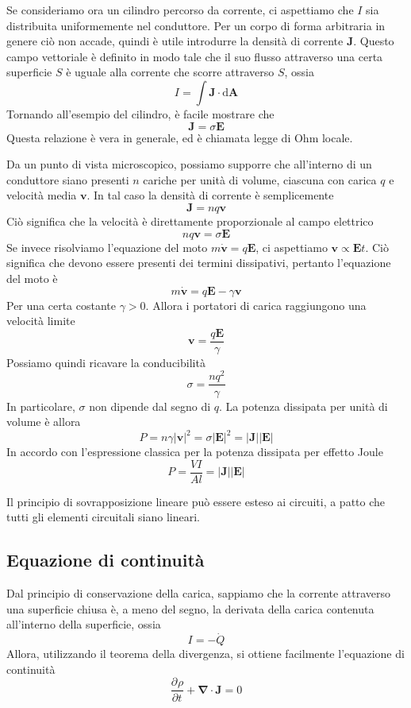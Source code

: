 \documentclass[a4paper,11pt]{book}
\newcommand{\dif}{\mathrm{d}}
\newcommand{\der}[3][]{\frac{\partial ^{#1}#2}{\partial {#3}^{#1}}}
\let\oldnabla\nabla
\renewcommand{\nabla}{\vec{\oldnabla}}
\renewcommand{\vec}[1]{\mathbf{#1}}
\theoremstyle{theorem}
\theoremstyle{definition}
\begin{document}
Se consideriamo ora un cilindro percorso da corrente, ci aspettiamo che $I$ sia distribuita uniformemente nel conduttore. Per un corpo di forma arbitraria in genere ciò non accade, quindi è utile introdurre la densità di corrente $\vec{J}$. Questo campo vettoriale è definito in modo tale che il suo flusso attraverso una certa superficie $S$ è uguale alla corrente che scorre attraverso $S$, ossia
\[I=\int\vec{J}\cdot\dif\vec{A}\]
Tornando all'esempio del cilindro, è facile mostrare che
\[\vec{J}=\sigma\vec{E}\]
Questa relazione è vera in generale, ed è chiamata legge di Ohm locale. 

Da un punto di vista microscopico, possiamo supporre che all'interno di un conduttore siano presenti $n$ cariche per unità di volume, ciascuna con carica $q$ e velocità media $\vec{v}$. In tal caso la densità di corrente è semplicemente
\[\vec{J}=nq\vec{v}\]
Ciò significa che la velocità è direttamente proporzionale al campo elettrico
\[nq\vec{v}=\sigma\vec{E}\]
Se invece risolviamo l'equazione del moto $m\dot{\vec{v}}=q\vec{E}$, ci aspettiamo $\vec{v}\propto\vec{E}t$. Ciò significa che devono essere presenti dei termini dissipativi, pertanto l'equazione del moto è
\[m\dot{\vec{v}}=q\vec{E}-\gamma\vec{v}\]
Per una certa costante $\gamma>0$. Allora i portatori di carica raggiungono una velocità limite
\[\vec{v}=\frac{q\vec{E}}{\gamma}\]
Possiamo quindi ricavare la conducibilità
\[\sigma=\frac{nq^2}{\gamma}\]
In particolare, $\sigma$ non dipende dal segno di $q$. La potenza dissipata per unità di volume è allora
\[P=n\gamma|\vec{v}|^2=\sigma |\vec{E}|^2=|\vec{J}||\vec{E}|\]
In accordo con l'espressione classica per la potenza dissipata per effetto Joule
\[P=\frac{VI}{Al}=|\vec{J}||\vec{E}|\]

Il principio di sovrapposizione lineare può essere esteso ai circuiti, a patto che tutti gli elementi circuitali siano lineari.
\subsection{Equazione di continuità}
Dal principio di conservazione della carica, sappiamo che la corrente attraverso una superficie chiusa è, a meno del segno, la derivata della carica contenuta all'interno della superficie, ossia
\[I=-\dot{Q}\]
Allora, utilizzando il teorema della divergenza, si ottiene facilmente l'equazione di continuità
\[\der{\rho}{t}+\nabla\cdot\vec{J}=0\]
\end{document}

